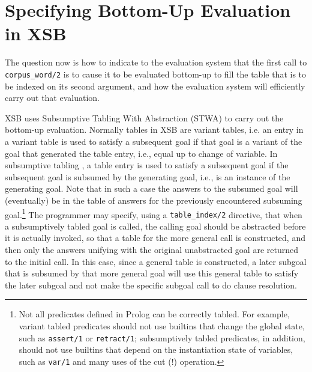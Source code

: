 \section{Specifying Bottom-Up Evaluation in XSB}

The question now is how to indicate to the evaluation system that the
first call to {\tt corpus\_word/2} is to cause it to be evaluated
bottom-up to fill the table that is to be indexed on its second
argument, and how the evaluation system will efficiently carry out
that evaluation.  

XSB uses Subsumptive Tabling With Abstraction (STWA) to carry out the
bottom-up evaluation.  Normally tables in XSB are variant tables,
i.e. an entry in a variant table is used to satisfy a subsequent goal
if that goal is a variant of the goal that generated the table entry,
i.e., equal up to change of variable.  In subsumptive tabling
\cite{Johnson1999,Tries@JLP,ejohnson-tapd,EJohnson-thesis,DBLP:journals/corr/abs-1107-5556},
a table entry is used to satisfy a subsequent goal if the subsequent
goal is subsumed by the generating goal, i.e., is an instance of the
generating goal.  Note that in such a case the answers to the subsumed
goal will (eventually) be in the table of answers for the previously
encountered subsuming goal.\footnote{Not all predicates defined in
  Prolog can be correctly tabled.  For example, variant tabled
  predicates should not use builtins that change the global state,
  such as {\tt assert/1} or {\tt retract/1}; subsumptively tabled
  predicates, in addition, should not use builtins that depend on the
  instantiation state of variables, such as {\tt var/1} and many uses
  of the cut (!) operation.  } The programmer may specify, using a
{\tt table\_index/2} directive, that when a subsumptively tabled goal
is called, the calling goal should be abstracted before it is actually
invoked, so that a table for the more general call is constructed, and
then only the answers unifying with the original unabstracted goal are
returned to the initial call.  In this case, since a general table is
constructed, a later subgoal that is subsumed by that more general
goal will use this general table to satisfy the later subgoal and not
make the specific subgoal call to do clause resolution.


